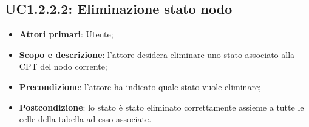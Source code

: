 \subsection{UC1.2.2.2: Eliminazione stato nodo} 
\hypertarget{UC1.2.2.2}{} 
\begin{itemize} 
	\item{\textbf{Attori primari}: Utente;} 
	\item{\textbf{Scopo e descrizione}: l'attore desidera eliminare uno stato associato alla CPT del nodo corrente;} 
	\item{\textbf{Precondizione}: l'attore ha indicato quale stato vuole eliminare;} 
	\item{\textbf{Postcondizione}: lo stato è stato eliminato correttamente assieme a tutte le celle della tabella ad esso associate.} 
\end{itemize} 
